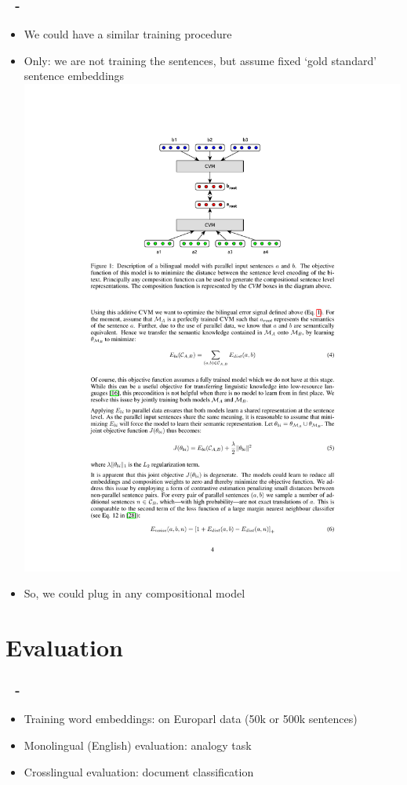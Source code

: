 \documentclass{beamer}
\newenvironment{dia}
{
\begin{frame}[fragile, environment=dia]
\frametitle{\insertsection
\ifx\insertsubsection\empty\else
      \,~-~\insertsubsection             %
   \fi}
}
{
\end{frame}
}
\begin{document}
\begin{dia}
\begin{itemize}
\item We could have a similar training procedure
\item Only: we are not training the sentences, but assume fixed `gold standard' sentence embeddings
\includegraphics[width=.7\linewidth]{figures/hermannBlunsomHalf}
\item So, we could plug in any compositional model 
\end{itemize}
\end{dia}




\section{Evaluation}
\begin{dia}
\begin{itemize}
\item Training word embeddings: on Europarl data (50k or 500k sentences)
\item Monolingual (English) evaluation: analogy task
\item Crosslingual evaluation: document classification
\end{itemize}
\end{dia}
\end{document}
